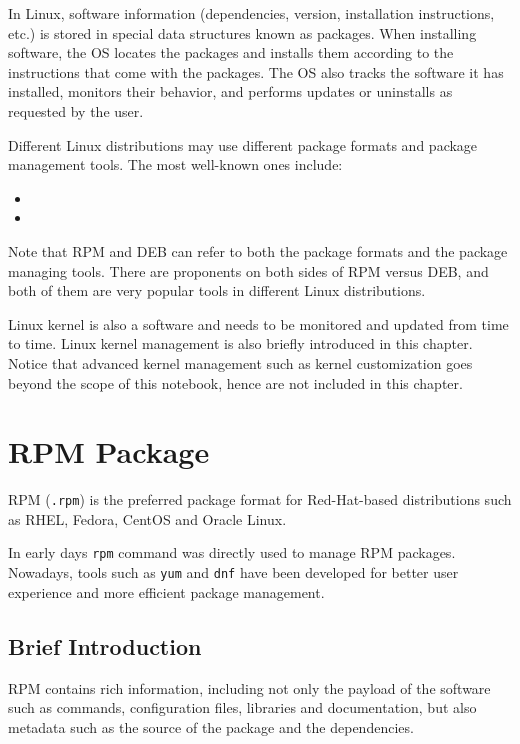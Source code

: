 In Linux, software information (dependencies, version, installation instructions, etc.) is stored in special data structures known as packages. When installing software, the OS locates the packages and installs them according to the instructions that come with the packages. The OS also tracks the software it has installed, monitors their behavior, and performs updates or uninstalls as requested by the user. 

Different Linux distributions may use different package formats and package management tools. The most well-known ones include:
\begin{itemize}
	\item {}
	\item {}
\end{itemize}
Note that RPM and DEB can refer to both the package formats and the package managing tools. There are proponents on both sides of RPM versus DEB, and both of them are very popular tools in different Linux distributions.

Linux kernel is also a software and needs to be monitored and updated from time to time. Linux kernel management is also briefly introduced in this chapter. Notice that advanced kernel management such as kernel customization goes beyond the scope of this notebook, hence are not included in this chapter.

\section{RPM Package}

RPM (\verb|.rpm|) is the preferred package format for Red-Hat-based distributions such as RHEL, Fedora, CentOS and Oracle Linux. 

In early days \verb|rpm| command was directly used to manage RPM packages. Nowadays, tools such as \verb|yum| and \verb|dnf| have been developed for better user experience and more efficient package management. 

\subsection{Brief Introduction}

RPM contains rich information, including not only the payload of the software such as commands, configuration files, libraries and documentation, but also metadata such as the source of the package and the dependencies.

